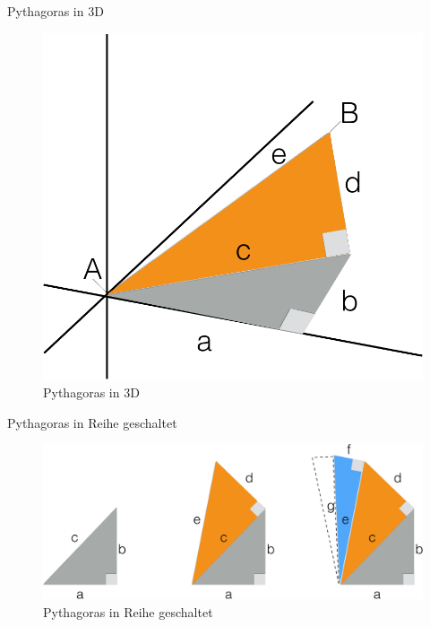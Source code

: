\begin{frame}{Pythagoras in 3D}

\begin{figure}

{\centering \includegraphics[width=0.5\linewidth]{../images/cluster/pythagoras2_crop} 

}

\caption{Pythagoras in 3D}\label{fig:pythagoras2}
\end{figure}

\end{frame}

\begin{frame}{Pythagoras in Reihe geschaltet}

\begin{figure}

{\centering \includegraphics[width=0.8\linewidth]{../images/cluster/pythagoras_crop} 

}

\caption{Pythagoras in Reihe geschaltet}\label{fig:pythagoras}
\end{figure}

\end{frame}

